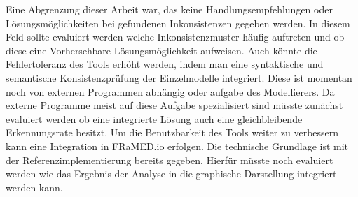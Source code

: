 Eine Abgrenzung dieser Arbeit war, das keine Handlungsempfehlungen oder Lösungsmöglichkeiten bei gefundenen Inkonsistenzen gegeben werden.
In diesem Feld sollte evaluiert werden welche Inkonsistenzmuster häufig auftreten und ob diese eine Vorhersehbare Lösungsmöglichkeit aufweisen.
Auch könnte die Fehlertoleranz des Tools erhöht werden, indem man eine syntaktische und semantische Konsistenzprüfung der Einzelmodelle integriert.
Diese ist momentan noch von externen Programmen abhängig oder aufgabe des Modellierers.
Da externe Programme meist auf diese Aufgabe spezialisiert sind müsste zunächst evaluiert werden ob eine integrierte Lösung auch eine gleichbleibende Erkennungsrate besitzt.
Um die Benutzbarkeit des Tools weiter zu verbessern kann eine Integration in FRaMED.io erfolgen.
Die technische Grundlage ist mit der Referenzimplementierung bereits gegeben.
Hierfür müsste noch evaluiert werden wie das Ergebnis der Analyse in die graphische Darstellung integriert werden kann.
